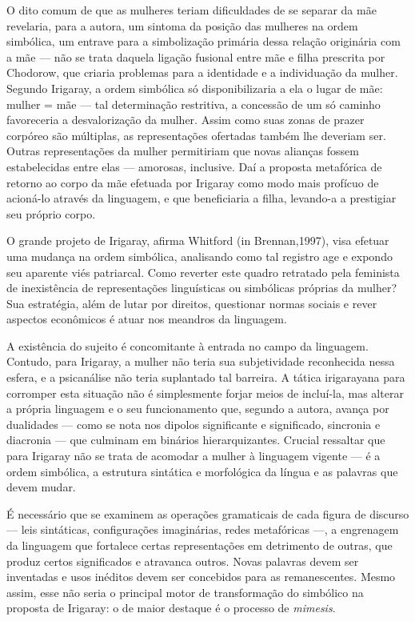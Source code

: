 O dito comum de que as mulheres teriam dificuldades de se separar da mãe
revelaria, para a autora, um sintoma da posição das mulheres na ordem
simbólica, um entrave para a simbolização primária dessa relação
originária com a mãe --- não se trata daquela ligação fusional entre mãe
e filha prescrita por Chodorow, que criaria problemas para a identidade
e a individuação da mulher. Segundo Irigaray, a ordem simbólica só
disponibilizaria a ela o lugar de mãe: mulher = mãe --- tal determinação
restritiva, a concessão de um só caminho favoreceria a desvalorização da
mulher. Assim como suas zonas de prazer corpóreo são múltiplas, as
representações ofertadas também lhe deveriam ser. Outras representações
da mulher permitiriam que novas alianças fossem estabelecidas entre elas
--- amorosas, inclusive. Daí a proposta metafórica de retorno ao corpo
da mãe efetuada por Irigaray como modo mais profícuo de acioná-lo
através da linguagem, e que beneficiaria a filha, levando-a a prestigiar
seu próprio corpo.

O grande projeto de Irigaray, afirma Whitford (in Brennan,1997), visa
efetuar uma mudança na ordem simbólica, analisando como tal registro age
e expondo seu aparente viés patriarcal. Como reverter este quadro
retratado pela feminista de inexistência de representações linguísticas
ou simbólicas próprias da mulher? Sua estratégia, além de lutar por
direitos, questionar normas sociais e rever aspectos econômicos é atuar
nos meandros da linguagem.

A existência do sujeito é concomitante à entrada no campo da linguagem.
Contudo, para Irigaray, a mulher não teria sua subjetividade reconhecida
nessa esfera, e a psicanálise não teria suplantado tal barreira. A
tática irigarayana para corromper esta situação não é simplesmente
forjar meios de incluí-la, mas alterar a própria linguagem e o seu
funcionamento que, segundo a autora, avança por dualidades --- como se
nota nos dipolos significante e significado, sincronia e diacronia ---
que culminam em binários hierarquizantes. Crucial ressaltar que para
Irigaray não se trata de acomodar a mulher à linguagem vigente --- é a
ordem simbólica, a estrutura sintática e morfológica da língua e as
palavras que devem mudar.

É necessário que se examinem as operações gramaticais de cada figura de
discurso --- leis sintáticas, configurações imaginárias, redes
metafóricas ---, a engrenagem da linguagem que fortalece certas
representações em detrimento de outras, que produz certos significados e
atravanca outros. Novas palavras devem ser inventadas e usos inéditos
devem ser concebidos para as remanescentes. Mesmo assim, esse não seria
o principal motor de transformação do simbólico na proposta de Irigaray:
o de maior destaque é o processo de \emph{mimesis}.

